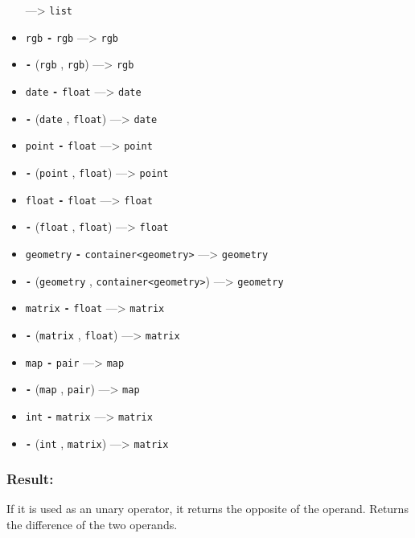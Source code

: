 \documentclass[]{book}
\theoremstyle{definition}
\theoremstyle{definition}
\theoremstyle{definition}
\theoremstyle{remark}
\begin{document}
\begin{itemize}
  ---\textgreater{} \texttt{list}
\item
  \texttt{rgb} \textbf{\texttt{-}} \texttt{rgb} ---\textgreater{}
  \texttt{rgb}
\item
  \textbf{\texttt{-}} (\texttt{rgb} , \texttt{rgb}) ---\textgreater{}
  \texttt{rgb}
\item
  \texttt{date} \textbf{\texttt{-}} \texttt{float} ---\textgreater{}
  \texttt{date}
\item
  \textbf{\texttt{-}} (\texttt{date} , \texttt{float}) ---\textgreater{}
  \texttt{date}
\item
  \texttt{point} \textbf{\texttt{-}} \texttt{float} ---\textgreater{}
  \texttt{point}
\item
  \textbf{\texttt{-}} (\texttt{point} , \texttt{float})
  ---\textgreater{} \texttt{point}
\item
  \texttt{float} \textbf{\texttt{-}} \texttt{float} ---\textgreater{}
  \texttt{float}
\item
  \textbf{\texttt{-}} (\texttt{float} , \texttt{float})
  ---\textgreater{} \texttt{float}
\item
  \texttt{geometry} \textbf{\texttt{-}}
  \texttt{container\textless{}geometry\textgreater{}} ---\textgreater{}
  \texttt{geometry}
\item
  \textbf{\texttt{-}} (\texttt{geometry} ,
  \texttt{container\textless{}geometry\textgreater{}}) ---\textgreater{}
  \texttt{geometry}
\item
  \texttt{matrix} \textbf{\texttt{-}} \texttt{float} ---\textgreater{}
  \texttt{matrix}
\item
  \textbf{\texttt{-}} (\texttt{matrix} , \texttt{float})
  ---\textgreater{} \texttt{matrix}
\item
  \texttt{map} \textbf{\texttt{-}} \texttt{pair} ---\textgreater{}
  \texttt{map}
\item
  \textbf{\texttt{-}} (\texttt{map} , \texttt{pair}) ---\textgreater{}
  \texttt{map}
\item
  \texttt{int} \textbf{\texttt{-}} \texttt{matrix} ---\textgreater{}
  \texttt{matrix}
\item
  \textbf{\texttt{-}} (\texttt{int} , \texttt{matrix}) ---\textgreater{}
  \texttt{matrix}
\end{itemize}

\subsubsection{Result:}\label{result}

If it is used as an unary operator, it returns the opposite of the
operand. Returns the difference of the two operands.
\end{document}
